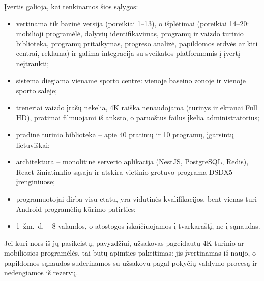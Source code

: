 Įvertis galioja, kai tenkinamos šios sąlygos:
\begin{itemize}
  \item vertinama tik bazinė versija (poreikiai 1--13), o išplėtimai
    (poreikiai 14--20: mobilioji programėlė, dalyvių identifikavimas,
    programų ir vaizdo turinio biblioteka, programų pritaikymas, progreso
    analizė, papildomos erdvės ar kiti centrai, reklama) ir galima integracija su
    sveikatos platformomis į įvertį neįtraukti;
  \item sistema diegiama viename sporto centre: vienoje baseino zonoje ir
    vienoje sporto salėje;
  \item treneriai vaizdo įrašų nekelia, 4K raiška nenaudojama (turinys ir ekranai
    Full HD), pratimai filmuojami iš anksto, o paruoštus failus įkelia
    administratorius;
  \item pradinė turinio biblioteka – apie 40 pratimų ir 10 programų,
    įgarsintų lietuviškai;
  \item architektūra – monolitinė serverio aplikacija (NestJS, PostgreSQL, Redis), React
    žiniatinklio sąsaja ir atskira vietinio grotuvo programa DSDX5 įrenginiuose;
  \item programuotojai dirba visu etatu, yra vidutinės kvalifikacijos, bent vienas turi
    Android programėlių kūrimo patirties;
  \item 1~žm.~d. – 8 valandos, o atostogos įskaičiuojamos į tvarkaraštį, ne
    į sąnaudas.
\end{itemize}

Jei kuri nors iš jų pasikeistų,
pavyzdžiui, užsakovas pageidautų 4K turinio ar mobiliosios programėlės, tai
būtų apimties pakeitimas: jis įvertinamas iš naujo, o papildomos sąnaudos
suderinamos su užsakovu pagal pokyčių valdymo procesą ir nedengiamos iš
rezervų.
